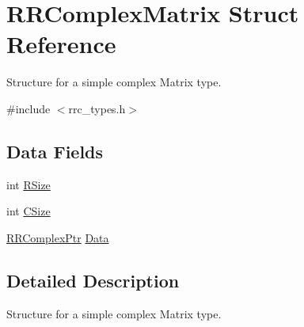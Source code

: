 \hypertarget{struct_r_r_complex_matrix}{\section{R\+R\+Complex\+Matrix Struct Reference}
\label{struct_r_r_complex_matrix}
}


Structure for a simple complex Matrix type.  




{\ttfamily \#include $<$rrc\+\_\+types.\+h$>$}

\subsection*{Data Fields}
\begin{DoxyCompactItemize}
\item 
int \hyperlink{struct_r_r_complex_matrix_a4d8512c879223c0e0d1522dae38e7819}{R\+Size}
\item 
int \hyperlink{struct_r_r_complex_matrix_a17c9a5894aa9cb3789346dcaa9c370bb}{C\+Size}
\item 
\hyperlink{rrc__types_8h_ada2046d7326c56ae29d8510fbf6622ee}{R\+R\+Complex\+Ptr} \hyperlink{struct_r_r_complex_matrix_a2853286fc6b37960bba4c8871da839fa}{Data}
\end{DoxyCompactItemize}


\subsection{Detailed Description}
Structure for a simple complex Matrix type. 

